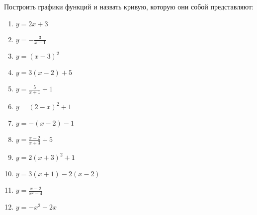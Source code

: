 \documentclass[algebra,twocolumn]{pum}
\begin{document}
  \begin{exercises}
    \begin{question}
      Построить графики функций и назвать кривую, которую они собой представляют:
      \begin{multicols}{2}
        \begin{enumerate}[label=\arabic*)]
        \item $y=2x+3$ 
        \item $y=-\frac{3}{x-1}$ 
        \item $y=(x-3)^2$ 
        \item $y=3(x-2)+5$ 
        \item $y=\frac{5}{x+1}+1$ 
        \item $y=(2-x)^2+1$ 
        \item $y=-(x-2)-1$ 
        \item $y=\frac{x-2}{x+3}+5$ 
        \item $y=2(x+3)^2+1$ 
        \item $y=3(x+1)-2(x-2)$ 
        \item $y=\frac{x-2}{x^2-4}$ 
        \item $y=-x^2-2x$ 
      \end{enumerate}
    \end{multicols}
  \end{question}


\end{exercises}
\end{document}
